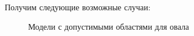 \documentclass[14pt]{article}
\begin{document}
\begin{figure}[H]
\caption{}
\label{fig:intersection_of_fields}
\end{figure}

Получим следующие возможные случаи:

\begin{figure}[H]
\caption{Модели с допустимыми областями для овала}
\label{fig:curves_with_ovals}
\end{figure}
\end{document}
